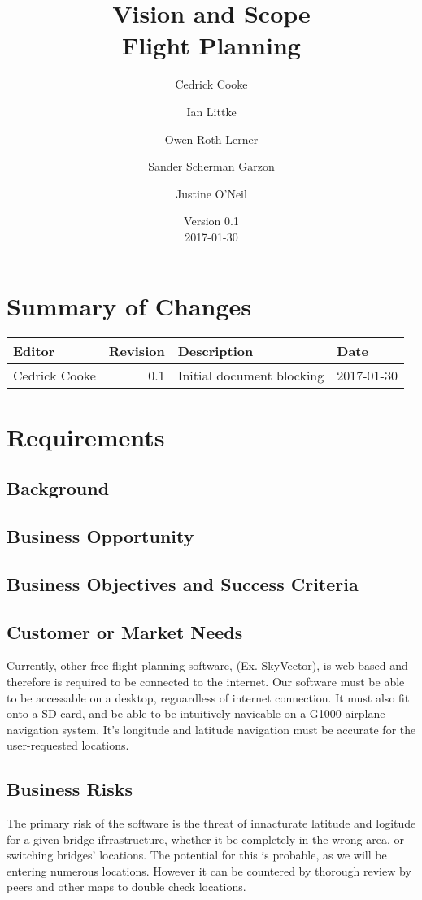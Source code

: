 \documentclass[12pt, letterpaper]{article}
\title{Vision and Scope \\
Flight Planning
}
\author{ Cedrick Cooke
    \and Ian Littke
    \and Owen Roth-Lerner
    \and Sander Scherman Garzon
    \and Justine O'Neil
}
\date{Version 0.1 \\ 2017-01-30}
\begin{document}
\maketitle

\tableofcontents

\section*{Summary of Changes}
\begin{tabularx}{\textwidth}{|l|r|X|l|}
\hline
Editor & Revision & Description & Date \\ \hline \hline
Cedrick Cooke & 0.1 & Initial document blocking & 2017-01-30 \\ \hline
\end{tabularx}

\section{Requirements}
\subsection{Background}
\subsection{Business Opportunity}
\subsection{Business Objectives and Success Criteria}
\subsection{Customer or Market Needs}
Currently, other free flight planning software, (Ex. SkyVector), is web based and therefore is required to be connected to the internet. Our software must be able to be accessable on a desktop, reguardless of internet connection. It must also fit onto a SD card, and be able to be intuitively navicable on a G1000 airplane navigation system. It's longitude and latitude navigation must be accurate for the user-requested locations. 
\subsection{Business Risks}
The primary risk of the software is the threat of innacturate latitude and logitude for a given bridge ifrrastructure, whether it be completely in the wrong area, or switching bridges' locations. The potential for this is probable, as we will be entering numerous locations. However it can be countered by thorough review by peers and other maps to double check locations.
\end{document}
